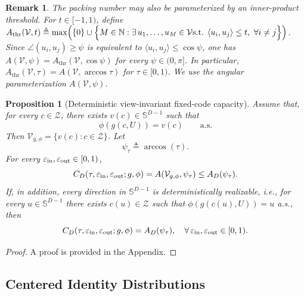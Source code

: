 \documentclass[journal]{IEEEtran}
\newtheorem{remark}[theorem]{Remark}
\newtheorem{proposition}[theorem]{Proposition}
\begin{document}
\begin{bibunit}
\begin{remark}
%
The packing number may also be parameterized by an inner-product threshold. For $t\in[-1,1)$, define $A_{\mathrm{thr}}(\mathcal V,t) \triangleq \max\Bigl(\{0\}\cup\Bigl\{ M\in\mathbb N:\exists\,u_1,\ldots,u_M\in\mathcal V \text{s.t. }\langle u_i,u_j\rangle\le t,\ \forall i\neq j \Bigr\}\Bigr)$. Since $\angle(u_i,u_j)\ge \psi$ is equivalent to $\langle u_i,u_j\rangle\le \cos\psi$, one has $A(\mathcal V,\psi)=A_{\mathrm{thr}}(\mathcal V,\cos\psi)$ for every $\psi\in(0,\pi]$. In particular, $A_{\mathrm{thr}}(\mathcal V,\tau)=A(\mathcal V,\arccos\tau)$ for $\tau\in[0,1)$. We use the angular parameterization $A(\mathcal V,\psi)$.
\end{remark}


  
\begin{proposition}[Deterministic view-invariant fixed-code capacity]
\label{prop:deterministic_capacity_main}
%
Assume that, for every $c\in\mathcal Z$, there exists $v(c)\in\mathbb S^{D-1}$ such that
%
\begin{equation}
\phi(g(c,U))=v(c)\qquad\mathrm{a.s.}
\label{eq:pipeline_view_invariance}
\end{equation}
%
Then $\mathcal V_{g,\phi}=\{v(c):c\in\mathcal Z\}$. Let
%
\begin{equation}
\psi_\tau\triangleq\arccos(\tau).
\end{equation}
%
For every $\varepsilon_{\rm in},\varepsilon_{\rm out}\in[0,1)$,
%
\begin{equation}
C_D(\tau,\varepsilon_{\rm in},\varepsilon_{\rm out};g,\phi) =
A(\mathcal V_{g,\phi},\psi_\tau) \le
A_D(\psi_\tau).
\label{eq:deterministic_capacity_upper_main}
\end{equation}
%
If, in addition, every direction in $\mathbb S^{D-1}$ is deterministically realizable, i.e., for every $u\in\mathbb S^{D-1}$ there exists $c(u)\in\mathcal Z$ such that $\phi(g(c(u),U))=u$ a.s., then
%
\begin{equation}
C_D(\tau,\varepsilon_{\rm in},\varepsilon_{\rm out};g,\phi) = A_D(\psi_\tau),
\quad \forall\, \varepsilon_{\rm in},\varepsilon_{\rm out}\in[0,1).
\end{equation}
%
\end{proposition}

\begin{proof}
A proof is provided in the Appendix.
\end{proof}




\subsection{Centered Identity Distributions}
\label{subsec:centered_identity_distributions}


\end{bibunit}
\end{document}
